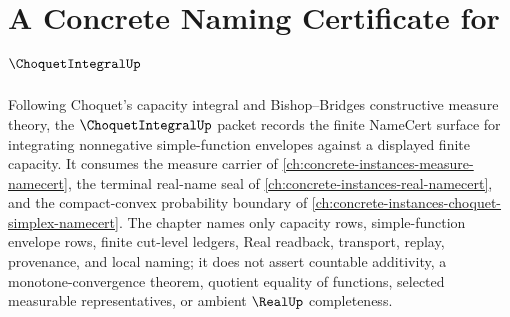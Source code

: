 \chapter{A Concrete Naming Certificate for $\ChoquetIntegralUp$}
\label{ch:concrete-instances-choquet-integral-namecert}

Following Choquet's capacity integral and Bishop--Bridges constructive measure theory, the $\ChoquetIntegralUp$ packet records the finite NameCert surface for integrating nonnegative simple-function envelopes against a displayed finite capacity. It consumes the measure carrier of \autoref{ch:concrete-instances-measure-namecert}, the terminal real-name seal of \autoref{ch:concrete-instances-real-namecert}, and the compact-convex probability boundary of \autoref{ch:concrete-instances-choquet-simplex-namecert}. The chapter names only capacity rows, simple-function envelope rows, finite cut-level ledgers, Real readback, transport, replay, provenance, and local naming; it does not assert countable additivity, a monotone-convergence theorem, quotient equality of functions, selected measurable representatives, or ambient $\RealUp$ completeness.

